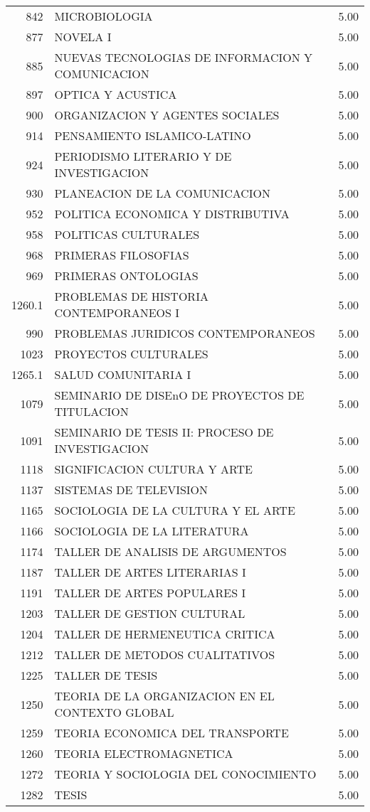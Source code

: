 \documentclass[12pt]{article}
\begin{document}
\begin{table}[ht]
{\begin{tabular}{rlr}
  842 & MICROBIOLOGIA & 5.00 \\ 
  877 & NOVELA I & 5.00 \\ 
  885 & NUEVAS TECNOLOGIAS DE INFORMACION Y COMUNICACION & 5.00 \\ 
  897 & OPTICA Y ACUSTICA & 5.00 \\ 
  900 & ORGANIZACION Y AGENTES SOCIALES & 5.00 \\ 
  914 & PENSAMIENTO ISLAMICO-LATINO & 5.00 \\ 
  924 & PERIODISMO LITERARIO Y DE INVESTIGACION & 5.00 \\ 
  930 & PLANEACION DE LA COMUNICACION & 5.00 \\ 
  952 & POLITICA ECONOMICA Y DISTRIBUTIVA & 5.00 \\ 
  958 & POLITICAS CULTURALES & 5.00 \\ 
  968 & PRIMERAS FILOSOFIAS & 5.00 \\ 
  969 & PRIMERAS ONTOLOGIAS & 5.00 \\ 
  1260.1 & PROBLEMAS DE HISTORIA CONTEMPORANEOS I & 5.00 \\ 
  990 & PROBLEMAS JURIDICOS CONTEMPORANEOS & 5.00 \\ 
  1023 & PROYECTOS CULTURALES & 5.00 \\ 
  1265.1 & SALUD COMUNITARIA I & 5.00 \\ 
  1079 & SEMINARIO DE DISEnO DE PROYECTOS DE TITULACION & 5.00 \\ 
  1091 & SEMINARIO DE TESIS II: PROCESO DE INVESTIGACION & 5.00 \\ 
  1118 & SIGNIFICACION CULTURA Y ARTE & 5.00 \\ 
  1137 & SISTEMAS DE TELEVISION & 5.00 \\ 
  1165 & SOCIOLOGIA DE LA CULTURA Y EL ARTE & 5.00 \\ 
  1166 & SOCIOLOGIA DE LA LITERATURA & 5.00 \\ 
  1174 & TALLER DE ANALISIS DE ARGUMENTOS & 5.00 \\ 
  1187 & TALLER DE ARTES LITERARIAS I & 5.00 \\ 
  1191 & TALLER DE ARTES POPULARES I & 5.00 \\ 
  1203 & TALLER DE GESTION CULTURAL & 5.00 \\ 
  1204 & TALLER DE HERMENEUTICA CRITICA & 5.00 \\ 
  1212 & TALLER DE METODOS CUALITATIVOS & 5.00 \\ 
  1225 & TALLER DE TESIS & 5.00 \\ 
  1250 & TEORIA DE LA ORGANIZACION EN EL CONTEXTO GLOBAL & 5.00 \\ 
  1259 & TEORIA ECONOMICA DEL TRANSPORTE & 5.00 \\ 
  1260 & TEORIA ELECTROMAGNETICA & 5.00 \\ 
  1272 & TEORIA Y SOCIOLOGIA DEL CONOCIMIENTO & 5.00 \\ 
  1282 & TESIS & 5.00 \\ 
    \hline
\end{tabular}}
\end{table}
\end{document}
